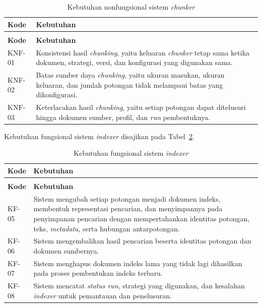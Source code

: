 \begin{longtable}{>{\RaggedRight\arraybackslash}p{2.2cm} >{\RaggedRight\arraybackslash}p{10.65cm}}
    \caption{Kebutuhan nonfungsional sistem \emph{chunker}}\label{tab:knf-chunker}\\
    \toprule
    \textbf{Kode} & \textbf{Kebutuhan}\\
    \midrule
    \endfirsthead
    \multicolumn{2}{l}{\small\itshape Lanjutan Tabel \ref{tab:knf-chunker}}\\
    \toprule
    \textbf{Kode} & \textbf{Kebutuhan}\\
    \midrule
    \endhead
    \bottomrule
    \endfoot
    KNF-01 & Konsistensi hasil \emph{chunking}, yaitu keluaran \emph{chunker} tetap sama ketika dokumen, strategi, versi, dan konfigurasi yang digunakan sama.\\
    KNF-02 & Batas sumber daya \emph{chunking}, yaitu ukuran masukan, ukuran keluaran, dan jumlah potongan tidak melampaui batas yang dikonfigurasi.\\
    KNF-03 & Keterlacakan hasil \emph{chunking}, yaitu setiap potongan dapat ditelusuri hingga dokumen sumber, profil, dan \emph{run} pembentuknya.\\
\end{longtable}

\noindent Kebutuhan fungsional sistem \emph{indexer} disajikan pada Tabel~\ref{tab:kf-indexer}.

\begin{longtable}{>{\RaggedRight\arraybackslash}p{2.2cm} >{\RaggedRight\arraybackslash}p{10.65cm}}
    \caption{Kebutuhan fungsional sistem \emph{indexer}}\label{tab:kf-indexer}\\
    \toprule
    \textbf{Kode} & \textbf{Kebutuhan}\\
    \midrule
    \endfirsthead
    \multicolumn{2}{l}{\small\itshape Lanjutan Tabel \ref{tab:kf-indexer}}\\
    \toprule
    \textbf{Kode} & \textbf{Kebutuhan}\\
    \midrule
    \endhead
    \bottomrule
    \endfoot
    KF-05 & Sistem mengubah setiap potongan menjadi dokumen indeks, membentuk representasi pencarian, dan menyimpannya pada penyimpanan pencarian dengan mempertahankan identitas potongan, teks, \emph{metadata}, serta hubungan antarpotongan.\\
    KF-06 & Sistem mengembalikan hasil pencarian beserta identitas potongan dan dokumen sumbernya.\\
    KF-07 & Sistem menghapus dokumen indeks lama yang tidak lagi dihasilkan pada proses pembentukan indeks terbaru.\\
    KF-08 & Sistem mencatat \emph{status run}, strategi yang digunakan, dan kesalahan \emph{indexer} untuk pemantauan dan penelusuran.\\
\end{longtable}


